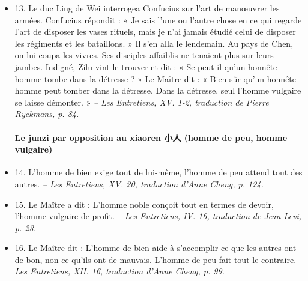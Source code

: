 \begin{itemize}
\item 13. \newline Le duc Ling de Wei interrogea Confucius sur l’art de manœuvrer les armées. Confucius répondit : \newline « Je sais l’une ou l’autre chose en ce qui regarde l’art de disposer les vases rituels, mais je n’ai jamais étudié celui de disposer les régiments et les bataillons. » \newline Il s’en alla le lendemain.          Au pays de Chen, on lui coupa les vivres. Ses disciples affaiblis ne tenaient plus sur leurs jambes. Indigné, Zilu vint le trouver et dit : \newline « Se peut-il qu’un honnête homme tombe dans la détresse ? » \newline Le Maître dit : « Bien sûr qu’un honnête homme peut tomber dans la détresse. Dans la détresse, seul l’homme vulgaire se laisse démonter. »  \textit{\small -- Les Entretiens, XV. 1-2, traduction de Pierre Ryckmans, p. 84.  }
\paragraph{Le junzi par opposition au xiaoren 小人 (homme de peu, homme vulgaire)  }
\item 14. \newline L’homme de bien exige tout de lui-même, l’homme de peu attend tout des autres.  \textit{\small -- Les Entretiens, XV. 20, traduction d’Anne Cheng, p. 124.  }
\item 15. \newline Le Maître a dit :  L’homme noble conçoit tout en termes de devoir, l’homme vulgaire de profit. \textit{\small -- Les Entretiens, IV. 16, traduction de Jean Levi, p. 23.  }
\item 16. \newline Le Maître dit : L’homme de bien aide à s’accomplir ce que les autres ont de bon, non ce qu’ils ont de mauvais. L’homme de peu fait tout le contraire.  -- \textit{\small Les Entretiens, XII.  16, traduction d’Anne Cheng, p. 99.  }

\end{itemize}
